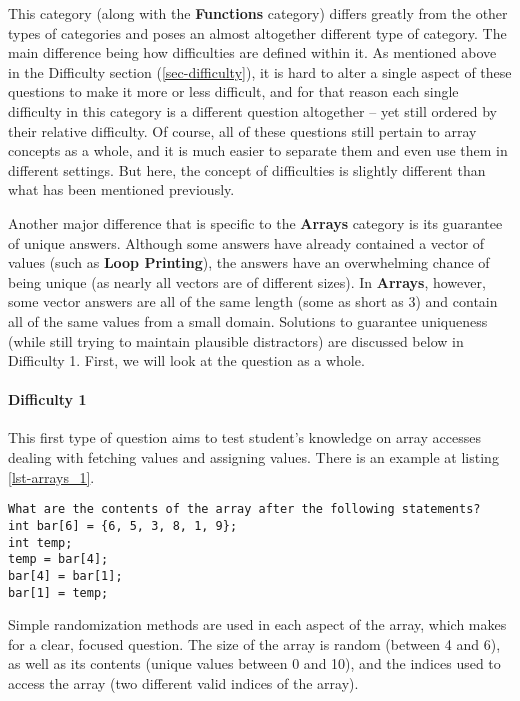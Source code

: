 \documentclass{article}
\begin{document}
This category (along with the \textbf{Functions} category) differs greatly from the other types of categories and poses an almost altogether different type of category. The main difference being how difficulties are defined within it. As mentioned above in the Difficulty section (\ref{sec-difficulty}), it is hard to alter a single aspect of these questions to make it more or less difficult, and
for that reason each single difficulty in this category is a different question altogether -- yet still ordered by their relative difficulty. Of course, all of these questions still pertain to array concepts
as a whole, and it is much easier to separate them and even use them in different settings. But here, the concept of difficulties is slightly different than what has been mentioned previously. 

Another major difference that is specific to the \textbf{Arrays} category is its guarantee of unique answers. Although some answers have already contained a vector of values (such as \textbf{Loop Printing}), 
the answers have an overwhelming chance of being unique (as nearly all vectors are of different sizes). In \textbf{Arrays}, however, some vector answers are all of the same length (some as short as 3) and contain all of the same values from a small domain. Solutions to guarantee uniqueness (while still trying to maintain plausible distractors) are discussed below in Difficulty 1. First, we will look
at the question as a whole.

\paragraph{Difficulty 1} \hfill \par

This first type of question aims to test student's knowledge on array accesses dealing with fetching values and assigning values. There is an example at listing \ref{lst-arrays_1}.

\begin{lstlisting}[caption={\textbf{Arrays} Difficulty 1 Example}, label=lst-arrays_1]
What are the contents of the array after the following statements? 
int bar[6] = {6, 5, 3, 8, 1, 9}; 
int temp; 
temp = bar[4]; 
bar[4] = bar[1]; 
bar[1] = temp; 
\end{lstlisting}


Simple randomization methods are used in each aspect of the array, which makes for a clear, focused question. The size of the array is random (between 4 and 6), as well as its contents
(unique values between 0 and 10), and the indices used to access the array (two different valid indices of the array). 
\end{document}
